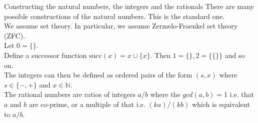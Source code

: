 \documentclass{beamer}
\begin{document}



\begin{frame}{Constructing the natural numbers, the integers and the rationals}
There are many possible constructions of the natural numbers. This is the standard one.\\
We assume set theory. In particular, we assume Zermelo-Fraenkel set theory (ZFC).\\
Let $0 = \{\}$. \\
Define a successor function $\text{succ}{(x)} = x \cup \{ x \}$. 
Then $1 = \{\}, 2 = \{\{\}\}$ and so on.\\
The integers can then be defined as ordered pairs of the form $(s, x)$ where $s \in \{-, +\}$ and
$x \in \mathbb{N}$. \\
The rational numbers are ratios of integers $a / b$ where the $gcd(a, b) = 1$ i.e. that $a$ and $b$ are
co-prime, or a multiple of that i.e. $(k a) / (k b)$ which is equivalent to $a / b$.
\end{frame}
\end{document}
